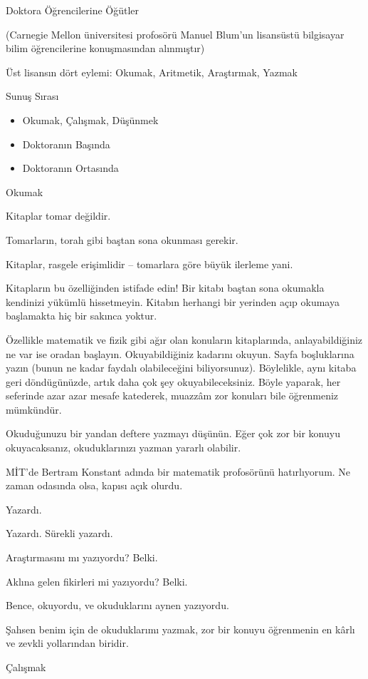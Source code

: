 \documentclass[12pt,fleqn]{article}\usepackage{../../common}
\begin{document}
Doktora Öğrencilerine Öğütler

(Carnegie Mellon üniversitesi profosörü Manuel Blum'un lisansüstü
bilgisayar bilim öğrencilerine konuşmasından alınmıştır)

Üst lisansın dört eylemi: Okumak, Aritmetik, Araştırmak, Yazmak

Sunuş Sırası

\begin{itemize}
   \item Okumak, Çalışmak, Düşünmek
   \item Doktoranın Başında
   \item Doktoranın Ortasında
\end{itemize}

Okumak

Kitaplar tomar değildir.

Tomarların, torah gibi baştan sona okunması gerekir.

Kitaplar, rasgele erişimlidir -- tomarlara göre büyük ilerleme yani.

Kitapların bu özelliğinden istifade edin! Bir kitabı baştan sona okumakla
kendinizi yükümlü hissetmeyin. Kitabın herhangi bir yerinden açıp okumaya
başlamakta hiç bir sakınca yoktur.

Özellikle matematik ve fizik gibi ağır olan konuların kitaplarında,
anlayabildiğiniz ne var ise oradan başlayın. Okuyabildiğiniz kadarını
okuyun. Sayfa boşluklarına yazın (bunun ne kadar faydalı olabileceğini
biliyorsunuz). Böylelikle, aynı kitaba geri döndügünüzde, artık daha çok
şey okuyabileceksiniz. Böyle yaparak, her seferinde azar azar mesafe
katederek, muazzâm zor konuları bile öğrenmeniz mümkündür.

Okuduğunuzu bir yandan deftere yazmayı düşünün. Eğer çok zor bir konuyu
okuyacaksanız, okuduklarınızı yazman yararlı olabilir.

MİT'de Bertram Konstant adında bir matematik profosörünü hatırlıyorum. Ne
zaman odasında olsa, kapısı açık olurdu.

Yazardı.

Yazardı. Sürekli yazardı.

Araştırmasını mı yazıyordu? Belki.

Aklına gelen fikirleri mi yazıyordu? Belki.

Bence, okuyordu, ve okuduklarını aynen yazıyordu.

Şahsen benim için de okuduklarımı yazmak, zor bir konuyu öğrenmenin en
kârlı ve zevkli yollarından biridir.

Çalışmak
\end{document}
